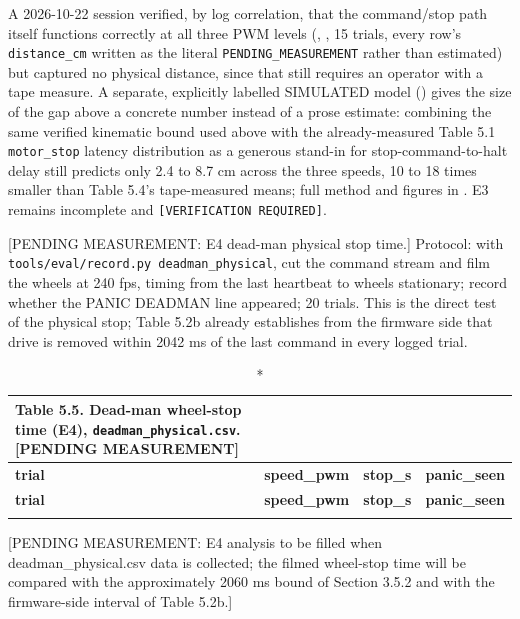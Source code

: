 A 2026-10-22 session verified, by log correlation, that the command/stop path itself functions correctly at all three PWM levels (\texttt{}, \texttt{}, 15 trials, every row's \texttt{distance\_cm} written as the literal \texttt{PENDING\_MEASUREMENT} rather than estimated) but captured no physical distance, since that still requires an operator with a tape measure. A separate, explicitly labelled SIMULATED model (\texttt{}) gives the size of the gap above a concrete number instead of a prose estimate: combining the same verified kinematic bound used above with the already-measured Table 5.1 \texttt{motor\_stop} latency distribution as a generous stand-in for stop-command-to-halt delay still predicts only 2.4 to 8.7 cm across the three speeds, 10 to 18 times smaller than Table 5.4's tape-measured means; full method and figures in \texttt{}. E3 remains incomplete and \texttt{[VERIFICATION REQUIRED]}.

[PENDING MEASUREMENT: E4 dead-man physical stop time.] Protocol: with \texttt{tools/eval/record.py deadman\_physical}, cut the command stream and film the wheels at 240 fps, timing from the last heartbeat to wheels stationary; record whether the PANIC DEADMAN line appeared; 20 trials. This is the direct test of the physical stop; Table 5.2b already establishes from the firmware side that drive is removed within 2042 ms of the last command in every logged trial.

\begin{center}
\begin{longtable}{|l|l|l|l|}
\caption*{Table 5.5. Dead-man wheel-stop time (E4), \texttt{deadman\_physical.csv}. [PENDING MEASUREMENT]}
\addcontentsline{lot}{table}{\protect\numberline{5.5}Dead-man wheel-stop time (E4), \texttt{deadman\_physical.csv}. [PENDING MEASUREMENT]}
\\
\hline
\textbf{trial} & \textbf{speed\_pwm} & \textbf{stop\_s} & \textbf{panic\_seen} \\
\hline
\endfirsthead
\hline
\textbf{trial} & \textbf{speed\_pwm} & \textbf{stop\_s} & \textbf{panic\_seen} \\
\hline
\endhead
 & & & \\
\hline
\end{longtable}
\end{center}

[PENDING MEASUREMENT: E4 analysis to be filled when deadman\_physical.csv data is collected; the filmed wheel-stop time will be compared with the approximately 2060 ms bound of Section 3.5.2 and with the firmware-side interval of Table 5.2b.]

